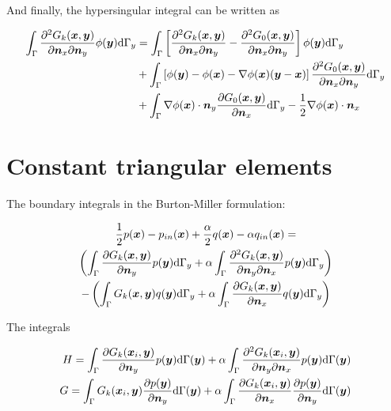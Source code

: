 \documentclass[a4paper, 10pt]{article}
\newcommand{\td}{\mathrm{d}}
\newcommand{\sx}{\bm{\mathnormal{x}}}
\newcommand{\sy}{\bm{\mathnormal{y}}}
\newcommand{\sn}{\bm{\mathnormal{n}}}
\begin{document}
And finally, the hypersingular integral can be written as

\begin{align}
	\int_\Gamma \frac{\partial^2 G_k(\sx, \sy)}{\partial \sn_x \partial \sn_y} \phi(\sy) \td \Gamma_y & = \int_\Gamma \left[\frac{\partial^2 G_k(\sx, \sy)}{\partial \sn_x \partial \sn_y} - \frac{\partial^2 G_0(\sx, \sy)}{\partial \sn_x \partial \sn_y}\right] \phi(\sy) \td \Gamma_y \nonumber \\
	& + \int_\Gamma \left[\phi(\sy) - \phi(\sx) - \nabla \phi(\sx) (\sy - \sx) \right] \frac{\partial^2 G_0(\sx, \sy)}{\partial \sn_x \partial \sn_y} \td \Gamma_y \nonumber \\
	& + \int_\Gamma \nabla \phi(\sx) \cdot \sn_y \frac{\partial G_0(\sx,\sy)}{\partial \sn_x} \td \Gamma_y -\frac{1}{2} \nabla \phi(\sx) \cdot \sn_x
\end{align}

\section{Constant triangular elements}

The boundary integrals in the Burton-Miller formulation:

\begin{multline}
	\frac{1}{2} p (\sx)
	-
	p_{in}(\sx)
	+
	\frac{\alpha}{2} q(\sx)
	-
	\alpha q_{in}(\sx)
	= \\
	\left(
	\int_{\Gamma} \frac{\partial{G}_k (\sx, \sy)}{\partial \sn_y} p(\sy) \td \Gamma_y
	+
	\alpha \int_{\Gamma}
	\frac{\partial^2{G}_k (\sx, \sy)}{\partial \sn_y \partial \sn_x} p(\sy) \td \Gamma_y
	\right)
	\\
	-
	\left(
	\int_{\Gamma} G_k(\sx,\sy) q(\sy) \td \Gamma_y
	+
	\alpha \int_{\Gamma}
	\frac{\partial G_k(\sx,\sy)}{\partial \sn_x}q(\sy) \td \Gamma_y
	\right)
\end{multline}

The integrals 
%

\begin{align}
	H = \int_{\Gamma}\frac{\partial{G}_k (\sx_i, \sy)}{\partial \sn_y} p(\sy) \td \Gamma(\sy)
	+ \alpha \int_\Gamma \frac{\partial^2{G}_k (\sx_i, \sy)}{\partial \sn_y \partial \sn_x} p(\sy) \td \Gamma(\sy) \nonumber \\
	G = \int_{\Gamma} G_k(\sx_i,\sy) \frac{\partial p(\sy)}{\partial \sn_y} \td \Gamma(\sy)
	+ \alpha \int_\Gamma \frac{\partial{G}_k (\sx_i, \sy)}{\partial \sn_x} \frac{\partial p(\sy)}{\partial \sn_y}  \td \Gamma(\sy)
\end{align}
\end{document}
